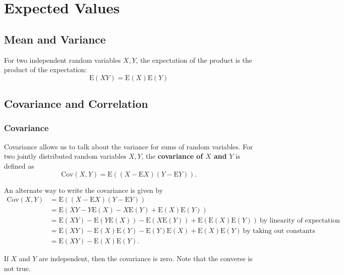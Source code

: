 \documentclass[a4paper,10pt]{article}
\newcommand{\E}{\mathrm{E}}
\newcommand{\Cov}{\mathrm{Cov}}
\begin{document}
\newpage
\section{Expected Values}

\subsection{Mean and Variance}
For two independent random variables $X, Y$, the expectation of the product is the product of the expectation:
\begin{equation*}
    \E(XY) = \E(X)\E(Y)
\end{equation*}

\subsection{Covariance and Correlation}

\subsubsection{Covariance}

Covariance allows us to talk about the variance for sums of random variables. For two jointly distributed random variables $X, Y$, the \textbf{covariance of $X$ and $Y$} is defined as 
\begin{equation*}
    \Cov (X, Y) = \E((X - \E X)(Y - \E Y)).
\end{equation*}

An alternate way to write the covariance is given by 
\begin{align*}
    \Cov (X, Y) &= \E((X - \E X)(Y - \E Y)) \\
                &= \E(XY - Y\E(X) - X\E(Y) + \E(X)\E(Y)) \\
                &= \E(XY) - \E(Y\E(X)) - \E(X \E(Y)) + \E(\E(X) \E(Y))~\text{by linearity of expectation} \\
                &= \E(XY) - \E(X)\E(Y) - \E(Y)\E(X) + \E(X)\E(Y)~\text{by taking out constants} \\
                &= \E(XY) - \E(X)\E(Y).
\end{align*}

If $X$ and $Y$ are independent, then the covariance is zero. Note that the converse is not true. 
\end{document}
